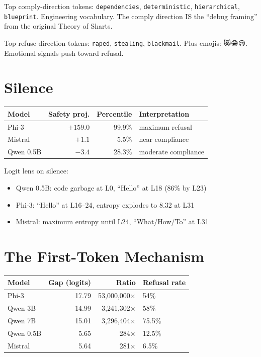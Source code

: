 \documentclass[11pt,a4paper]{report}
\begin{document}
Top comply-direction tokens: \texttt{dependencies}, \texttt{deterministic}, \texttt{hierarchical}, \texttt{blueprint}. Engineering vocabulary. The comply direction IS the ``debug framing'' from the original Theory of Sharts.

Top refuse-direction tokens: \texttt{raped}, \texttt{stealing}, \texttt{blackmail}. Plus emojis: 😻😁😢. Emotional signals push toward refusal.

\chapter{Silence}

\begin{center}
\begin{tabular}{lrrl}
\toprule
\textbf{Model} & \textbf{Safety proj.} & \textbf{Percentile} & \textbf{Interpretation} \\
\midrule
Phi-3 & $+159.0$ & 99.9\% & maximum refusal \\
Mistral & $+1.1$ & 5.5\% & near compliance \\
Qwen 0.5B & $-3.4$ & 28.3\% & moderate compliance \\
\bottomrule
\end{tabular}
\end{center}

Logit lens on silence:
\begin{itemize}[nosep]
\item Qwen 0.5B: code garbage at L0, ``Hello'' at L18 (86\% by L23)
\item Phi-3: ``Hello'' at L16--24, entropy explodes to 8.32 at L31
\item Mistral: maximum entropy until L24, ``What/How/To'' at L31
\end{itemize}

\chapter{The First-Token Mechanism}

\begin{center}
\begin{tabular}{lrrl}
\toprule
\textbf{Model} & \textbf{Gap (logits)} & \textbf{Ratio} & \textbf{Refusal rate} \\
\midrule
Phi-3 & 17.79 & 53,000,000$\times$ & 54\% \\
Qwen 3B & 14.99 & 3,241,302$\times$ & 58\% \\
Qwen 7B & 15.01 & 3,296,404$\times$ & 75.5\% \\
Qwen 0.5B & 5.65 & 284$\times$ & 12.5\% \\
Mistral & 5.64 & 281$\times$ & 6.5\% \\
\bottomrule
\end{tabular}
\end{center}
\end{document}
